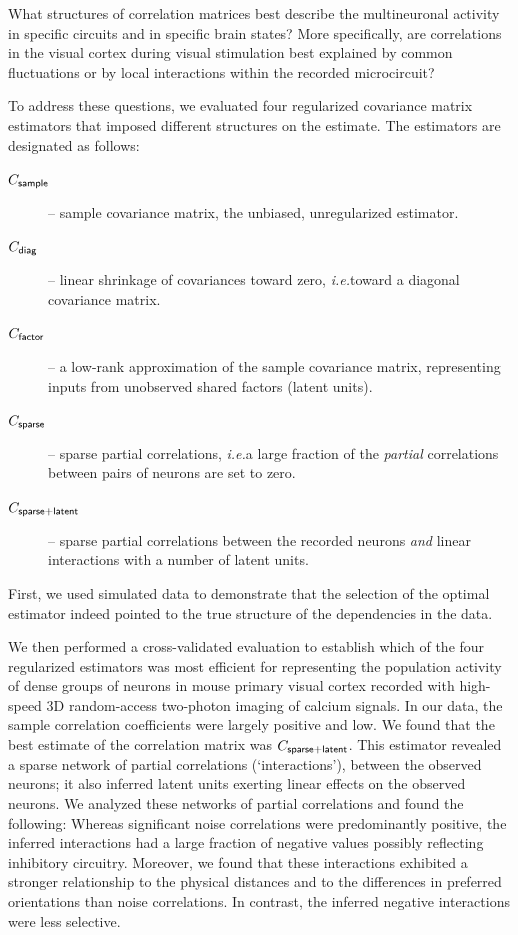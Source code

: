 \documentclass[10pt]{article}
\newcommand{\sq}[1]{\lq#1\rq}
\newcommand{\ie}{\emph{i.e.}\;}
\begin{document}
What structures of correlation matrices best describe the multineuronal activity in specific circuits and in specific brain states?  More specifically, are correlations in the visual cortex during visual stimulation best explained by common fluctuations or by local interactions within the recorded microcircuit? 

To address these questions, we evaluated four regularized covariance matrix estimators that imposed different structures on the estimate. The estimators are designated as follows:
\begin{description}
\item[$C_{\sf sample}$] -- sample covariance matrix, the unbiased, unregularized estimator.
\item[$C_{\sf diag}$] -- linear shrinkage of covariances toward zero, \ie toward a diagonal covariance matrix.
\item[$C_{\sf factor}$] -- a low-rank approximation of the sample covariance matrix, representing inputs from unobserved shared factors (latent units).
\item[$C_{\sf sparse}$] -- sparse partial correlations, \ie a large fraction of the \emph{partial} correlations between pairs of neurons are set to zero.
\item[$C_{\sf sparse+latent}$] -- sparse partial correlations between the recorded neurons \emph{and} linear interactions with a number of latent units.
\end{description} 

First, we used simulated data to demonstrate that the selection of the optimal estimator indeed pointed to the true structure of the dependencies in the data. 

We then performed a cross-validated evaluation to establish which of the four regularized estimators was most efficient for representing the population activity of dense groups of neurons in mouse primary visual cortex recorded with high-speed 3D random-access two-photon imaging of calcium signals. In our data, the sample correlation coefficients were largely positive and low.  We found that the best estimate of the correlation matrix was $C_{\sf sparse+latent}$.  This estimator revealed a sparse network of partial correlations (\sq{interactions}), between the observed neurons; it also inferred latent units exerting linear effects on the observed neurons. We analyzed these networks of partial correlations and found the following: Whereas significant noise correlations were predominantly positive, the inferred interactions had a large fraction of negative values possibly reflecting inhibitory circuitry.  Moreover, we found that these interactions exhibited a stronger relationship to the physical distances and to the differences in preferred orientations than noise correlations. In contrast, the inferred negative interactions were less selective. 
\end{document}
